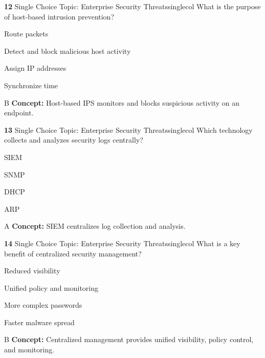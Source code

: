 \documentclass[10pt,a4paper]{article}
\begin{document}
\begin{qcard}{\color{white}\textbf{12} \hfill \small Single Choice \textbar{} Topic: Enterprise Security Threats}{singlecol}
What is the purpose of host-based intrusion prevention?

\begin{qoptions}
\item Route packets
\item Detect and block malicious host activity
\item Assign IP addresses
\item Synchronize time
\end{qoptions}
\begin{explainbox}{B}
\textbf{Concept:} Host-based IPS monitors and blocks suspicious activity on an endpoint.
\end{explainbox}
\end{qcard}

\begin{qcard}{\color{white}\textbf{13} \hfill \small Single Choice \textbar{} Topic: Enterprise Security Threats}{singlecol}
Which technology collects and analyzes security logs centrally?

\begin{qoptions}
\item SIEM
\item SNMP
\item DHCP
\item ARP
\end{qoptions}
\begin{explainbox}{A}
\textbf{Concept:} SIEM centralizes log collection and analysis.
\end{explainbox}
\end{qcard}

\begin{qcard}{\color{white}\textbf{14} \hfill \small Single Choice \textbar{} Topic: Enterprise Security Threats}{singlecol}
What is a key benefit of centralized security management?

\begin{qoptions}
\item Reduced visibility
\item Unified policy and monitoring
\item More complex passwords
\item Faster malware spread
\end{qoptions}
\begin{explainbox}{B}
\textbf{Concept:} Centralized management provides unified visibility, policy control, and monitoring.
\end{explainbox}
\end{qcard}
\end{document}
